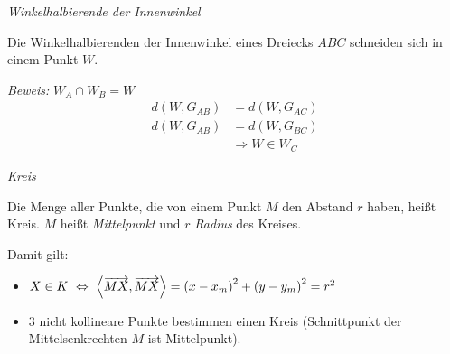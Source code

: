 \begin{mylemma}\textit{Winkelhalbierende der Innenwinkel}\medskip

    Die Winkelhalbierenden der Innenwinkel eines Dreiecks $ABC$ schneiden sich in einem Punkt $W$.\medskip

    \textit{Beweis:} $W_A \cap W_B = W$
    \begin{align*}
        d\left( W, G_{AB} \right) & = d\left( W, G_{AC} \right)\\
        d\left( W, G_{AB} \right) & = d\left( W, G_{BC} \right)\\
        & \Rightarrow W \in W_C
    \end{align*}
\end{mylemma}

\begin{mydef}\textit{Kreis}\medskip

    \begin{minipage}{0.7\textwidth}
        Die Menge aller Punkte, die von einem Punkt $M$ den Abstand $r$ haben, heißt Kreis.
        $M$ heißt \textit{Mittelpunkt} und $r$ \textit{Radius} des Kreises.
    \end{minipage}
    \begin{minipage}{0.3\textwidth}
        \begin{center}
        \end{center}
    \end{minipage}
    Damit gilt:
    \begin{itemize}
        \item $X \in K \ \Leftrightarrow \ \left\langle \ora{MX}, \ora{MX} \right\rangle = \left( x - x_m \right)^2 + \left( y - y_m \right)^2 = r^2$
        \item 3 nicht kollineare Punkte bestimmen einen Kreis (Schnittpunkt der Mittelsenkrechten $M$ ist Mittelpunkt).
    \end{itemize}
\end{mydef}

